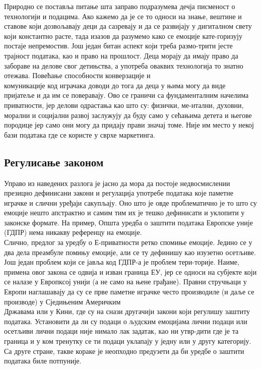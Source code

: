 \documentclass{article}
\begin{document}
Природно се поставља питање шта заправо подразумева дечја писменост о технологији и подацима. Ако кажемо да је се то односи на знање, вештине и ставове који дозвољавају деци да сазревају и да се развијају у дигиталном свету који константно расте, тада изазов да разумемо како се емоције кате-горизују постаје непремостив. Још један битан аспект који треба размо-трити јесте трајност података, као и право на прошлост. Деца морају да имају право да забораве на делове свог детињства, а употреба оваквих технологија то знатно отежава. Повећање способности конверзације и \\комуникације код играчака доводи до тога да деца у њима могу да виде пријатеље и да им се поверавају. Ово се граничи са фундаменталним начелима приватности, јер делови одрастања као што су: физички, ме-нтални, духовни, морални и социјални развој заслужују да буду само у сећањима детета и његове породице јер само они могу да придају прави значај томе. Није им место у некој бази података где се користе у сврхе маркетинга.

\subsection{Регулисање законом}
Управо из наведених разлога је јасно да мора да постоје недвосмислении презицно дефинисани закони и регулација употребе података које паметне играчке и слични уређаји сакупљају. Оно што је овде проблематично је то што су емоције нешто апстрактно и самим тим их је тешко дефинисати и уклопити у законске формате. На пример, Општа уредба о заштити података Европске уније (ГДПР) нема никакву референцу на емоције. \\Слично, предлог за уредбу о Е-приватности ретко спомиње емоције. Једино се у два дела преамбуле помињу емоције, али се ту дефинишу као изузетно осетљиве.  Још један проблем који се јавља код ГДПР-а је проблем тери-торије. Наиме, примена овог закона се одвија и изван граница ЕУ, јер се односи на субјекте који се налазе у Европксој унији (а не само на њене грађане). Правни стручњаци у Европи наглашавају да су се прве паметне играчке често производиле (и даље се производе) у Сједињеним Америчким \\Државама или у Кини, где су на снази другачији закони који регулишу заштиту података. Установити да ли су подаци о људским емоцијама лични подаци или осетљиви лични подаци није нимало лак задатак, као ни утвр-дити где је та граница и у ком тренутку се ти подаци уклапају у једну или у другу категорију. Са друге стране, такве кораке је неопходно предузети да би уредбе о заштити података биле потпуније. 
\end{document}
